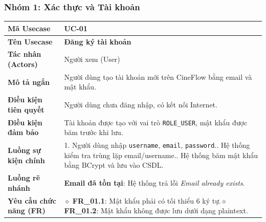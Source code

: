 
\subsubsection*{Nhóm 1: Xác thực và Tài khoản}

\begin{table}[H]
\renewcommand{\arraystretch}{1.3}
\centering
\begin{tabularx}{\textwidth}{|p{4.5cm}|X|}
\hline
\cellcolor{gray!15}\bfseries Mã Usecase & \textbf{UC-01} \\ \hline
\cellcolor{gray!15}\bfseries Tên Usecase & \textbf{Đăng ký tài khoản} \\ \hline
\cellcolor{gray!15}\bfseries Tác nhân (Actors) & Người xem (User) \\ \hline
\cellcolor{gray!15}\bfseries Mô tả ngắn & Người dùng tạo tài khoản mới trên CineFlow bằng email và mật khẩu. \\ \hline
\cellcolor{gray!15}\bfseries Điều kiện tiên quyết & Người dùng chưa đăng nhập, có kết nối Internet. \\ \hline
\cellcolor{gray!15}\bfseries Điều kiện đảm bảo & Tài khoản được tạo với vai trò \texttt{ROLE\_USER}, mật khẩu được băm trước khi lưu. \\ \hline
\cellcolor{gray!15}\bfseries Luồng sự kiện chính & 1. Người dùng nhập \texttt{username}, \texttt{email}, \texttt{password}.\newline 2. Hệ thống kiểm tra trùng lặp email/username.\newline 3. Hệ thống băm mật khẩu bằng BCrypt và lưu vào CSDL. \\ \hline
\cellcolor{gray!15}\bfseries Luồng rẽ nhánh & \textbf{Email đã tồn tại}: Hệ thống trả lỗi \textit{Email already exists}. \\ \hline
\cellcolor{gray!15}\bfseries Yêu cầu chức năng (FR) & $\diamond$ \textbf{FR\_01.1}: Mật khẩu phải có tối thiểu 6 ký tự.\newline $\diamond$ \textbf{FR\_01.2}: Mật khẩu không được lưu dưới dạng plaintext. \\ \hline
\end{tabularx}
\end{table}

